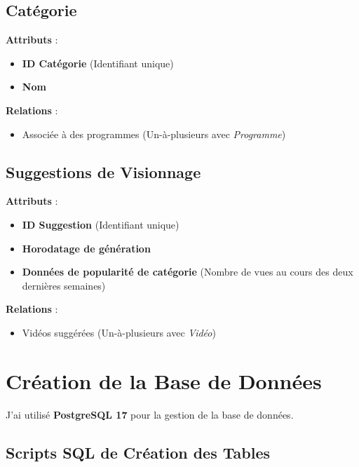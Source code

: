 \documentclass[a4paper,12pt]{article}
\begin{document}
\subsection{Catégorie}

\textbf{Attributs} :
\begin{itemize}
    \item \textbf{ID Catégorie} (Identifiant unique)
    \item \textbf{Nom}
\end{itemize}

\textbf{Relations} :
\begin{itemize}
    \item Associée à des programmes (Un-à-plusieurs avec \textit{Programme})
\end{itemize}

\subsection{Suggestions de Visionnage}

\textbf{Attributs} :
\begin{itemize}
    \item \textbf{ID Suggestion} (Identifiant unique)
    \item \textbf{Horodatage de génération}
    \item \textbf{Données de popularité de catégorie} (Nombre de vues au cours des deux dernières semaines)
\end{itemize}

\textbf{Relations} :
\begin{itemize}
    \item Vidéos suggérées (Un-à-plusieurs avec \textit{Vidéo})
\end{itemize}

\section{Création de la Base de Données}

J'ai utilisé \textbf{PostgreSQL 17} pour la gestion de la base de données.

\subsection{Scripts SQL de Création des Tables}
\end{document}
